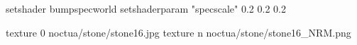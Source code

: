 setshader bumpspecworld
setshaderparam "specscale" 0.2 0.2 0.2

texture 0 noctua/stone/stone16.jpg
texture n noctua/stone/stone16_NRM.png
